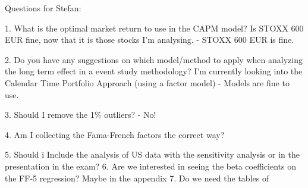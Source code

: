 Questions for Stefan:

1. What is the optimal market return to use in the CAPM model? Is STOXX 600 EUR fine, now that it is those stocks I'm analysing. 
- STOXX 600 EUR is fine. 

2. Do you have any suggestions on which model/method to apply when analyzing the long term effect in a event study methodology? I'm currently looking into the Calendar Time Portfolio Approach (using a factor model) - Models are fine to use. 

3. Should I remove the 1\% outliers?
- No!



4. Am I collecting the Fama-French factors the correct way? 

5.  Should i Include the analysis of US data with the sensitivity analysis or in the presentation in the exam?
6. Are we interested in seeing the beta coefficients on the FF-5 regression? Maybe in the appendix
7. Do we need the tables of 